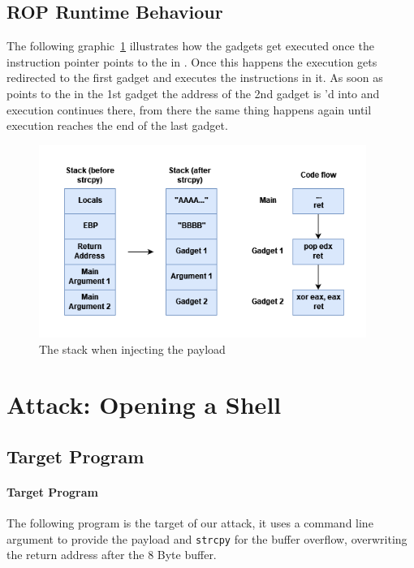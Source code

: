 \documentclass[journal=tosc,submission, notanonymous]{iacrtrans}
\begin{document}
\subsection{ROP Runtime Behaviour}
The following graphic~\cref{fig:executionatruntime} illustrates how the gadgets get executed once the instruction pointer  points to the  in . Once this happens the execution gets redirected to the first gadget and executes the instructions in it. As soon as  points to the  in the 1st gadget the address of the 2nd gadget is 'd into  and execution continues there, from there the same thing happens again until execution reaches the end of the last gadget.
\begin{figure}[h!]
  \centering
  \includegraphics[width=0.95\textwidth]{Ropchaineffect.png}
  \caption{The stack when injecting the payload}
  \label{fig:executionatruntime}
\end{figure}

\section{Attack: Opening a Shell}
\label{sec:attack}
\subsection{Target Program}
\paragraph{Target Program}
The following program is the target of our attack, it uses a command line argument to provide the payload and \Verb+strcpy+ for the buffer overflow, overwriting the return address after the 8 Byte buffer.
\end{document}
